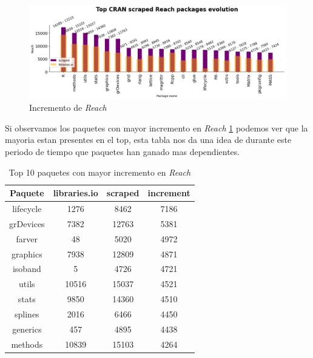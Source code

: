 \begin{figure}[ht!]
    \begin{center}
        \includegraphics[width=1\textwidth]{img/cran/reach_top2.png}
        \caption{Incremento de \textit{Reach}}
        \label{fig:Top reach scraped}
    \end{center}
\end{figure}

Si observamos los paquetes con mayor incremento en \textit{Reach} \ref{tab:Top 10 paquetes con mayor incremento en Reach}
podemos ver que la mayoria estan presentes en el top, esta tabla nos da una idea de durante este periodo
de tiempo que paquetes han ganado mas dependientes.

\begin{table}[ht!]
    \begin{center}
        \begin{tabular}{|c|c|c|c|}
            \hline
            \textbf{Paquete} & \textbf{libraries.io} & \textbf{scraped} & \textbf{increment} \\
            \hline
            lifecycle        & 1276                  & 8462             & 7186               \\
            grDevices        & 7382                  & 12763            & 5381               \\
            farver           & 48                    & 5020             & 4972               \\
            graphics         & 7938                  & 12809            & 4871               \\
            isoband          & 5                     & 4726             & 4721               \\
            utils            & 10516                 & 15037            & 4521               \\
            stats            & 9850                  & 14360            & 4510               \\
            splines          & 2016                  & 6466             & 4450               \\
            generics         & 457                   & 4895             & 4438               \\
            methods          & 10839                 & 15103            & 4264               \\
            \hline
        \end{tabular}
        \caption{Top 10 paquetes con mayor incremento en \textit{Reach}}
        \label{tab:Top 10 paquetes con mayor incremento en Reach}
    \end{center}
\end{table}

